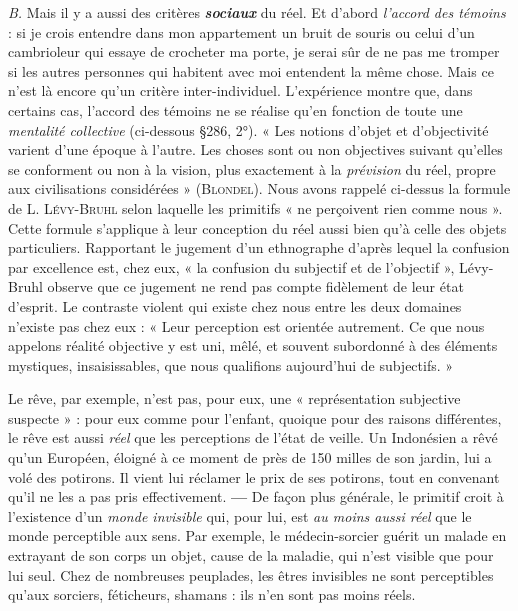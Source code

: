 {\it B.} Mais il y a aussi des critères \textbf{\textit {sociaux}} du réel. Et d’abord {\it l'accord
des témoins} : si je crois entendre dans mon appartement un bruit de
souris ou celui d’un cambrioleur qui essaye de crocheter ma porte,
je serai sûr de ne pas me tromper si les autres personnes qui habitent
avec moi entendent la même chose. Mais ce n’est là encore qu’un
critère inter-individuel. L'expérience montre que, dans certains cas,
l'accord des témoins ne se réalise qu’en fonction de toute une {\it mentalité
collective} (ci-dessous \S 286, 2°). « Les notions d’objet et d’objectivité
varient d’une époque à l’autre. Les choses sont ou non objectives
suivant qu’elles se conforment ou non à la vision, plus exactement à
la {\it prévision} du réel, propre aux civilisations considérées » (\textsc{Blondel}).
Nous avons rappelé ci-dessus la formule de L. \textsc{Lévy-Bruhl} selon
laquelle les primitifs « ne perçoivent rien comme nous ». Cette formule
s’applique à leur conception du réel aussi bien qu’à celle des
objets particuliers. Rapportant le jugement d’un ethnographe d’après
lequel la confusion par excellence est, chez eux, « la confusion du
subjectif et de l'objectif », Lévy-Bruhl observe que ce jugement ne
rend pas compte fidèlement de leur état d'esprit. Le contraste violent
qui existe chez nous entre les deux domaines n’existe pas chez
eux : « Leur perception est orientée autrement. Ce que nous appelons
réalité objective y est uni, mêlé, et souvent subordonné à des éléments
mystiques, insaisissables, que nous qualifions aujourd’hui de
subjectifs. »

\vspace{0.24cm}
{\footnotesize 
Le rêve, par exemple, n’est pas, pour eux, une « représentation subjective
suspecte » : pour eux comme pour l'enfant, quoique pour des raisons différentes,
le rêve est aussi {\it réel} que les perceptions de l’état de veille. Un
Indonésien a rêvé qu’un Européen, éloigné à ce moment de près de 150 milles
de son jardin, lui a volé des potirons. Il vient lui réclamer le prix de ses
potirons, tout en convenant qu’il ne les a pas pris effectivement. {\bf —} De façon
plus générale, le primitif croit à l'existence d’un \textsf{\textit {monde invisible}} qui, pour lui,
est {\it au moins aussi réel} que le monde perceptible aux sens. Par exemple,
le médecin-sorcier guérit un malade en extrayant de son corps un objet,
cause de la maladie, qui n’est visible que pour lui seul. Chez de nombreuses
peuplades, les êtres invisibles ne sont perceptibles qu’aux sorciers, féticheurs,
shamans : ils n’en sont pas moins réels.}
\vspace{0.31cm}

